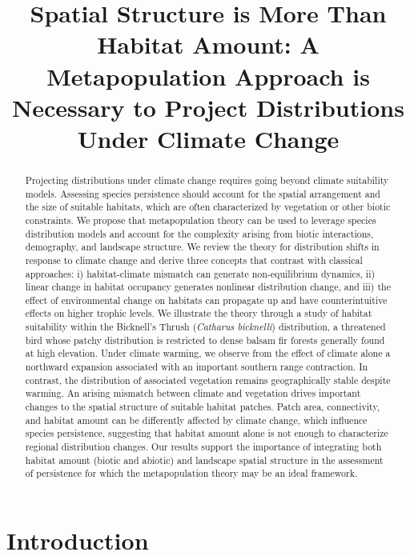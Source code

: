 \documentclass[12pt]{article}
\title{Spatial Structure is More Than Habitat Amount: A Metapopulation
Approach is Necessary to Project Distributions Under Climate Change}
\date{}
\begin{document}
\maketitle
\begin{abstract}
Projecting distributions under climate change requires going beyond
climate suitability models. Assessing species persistence should account
for the spatial arrangement and the size of suitable habitats, which are
often characterized by vegetation or other biotic constraints. We
propose that metapopulation theory can be used to leverage species
distribution models and account for the complexity arising from biotic
interactions, demography, and landscape structure. We review the theory
for distribution shifts in response to climate change and derive three
concepts that contrast with classical approaches: i) habitat-climate
mismatch can generate non-equilibrium dynamics, ii) linear change in
habitat occupancy generates nonlinear distribution change, and iii) the
effect of environmental change on habitats can propagate up and have
counterintuitive effects on higher trophic levels. We illustrate the
theory through a study of habitat suitability within the Bicknell's
Thrush (\emph{Catharus bicknelli}) distribution, a threatened bird whose
patchy distribution is restricted to dense balsam fir forests generally
found at high elevation. Under climate warming, we observe from the
effect of climate alone a northward expansion associated with an
important southern range contraction. In contrast, the distribution of
associated vegetation remains geographically stable despite warming. An
arising mismatch between climate and vegetation drives important changes
to the spatial structure of suitable habitat patches. Patch area,
connectivity, and habitat amount can be differently affected by climate
change, which influence species persistence, suggesting that habitat
amount alone is not enough to characterize regional distribution
changes. Our results support the importance of integrating both habitat
amount (biotic and abiotic) and landscape spatial structure in the
assessment of persistence for which the metapopulation theory may be an
ideal framework.
\end{abstract}
\newpage



\hypertarget{introduction}{%
\section{Introduction}\label{introduction}}
\end{document}
